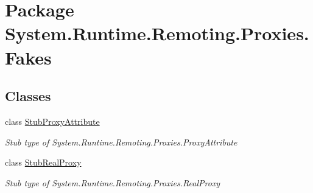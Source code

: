 \hypertarget{namespace_system_1_1_runtime_1_1_remoting_1_1_proxies_1_1_fakes}{\section{Package System.\-Runtime.\-Remoting.\-Proxies.\-Fakes}
\label{namespace_system_1_1_runtime_1_1_remoting_1_1_proxies_1_1_fakes}
}
\subsection*{Classes}
\begin{DoxyCompactItemize}
\item 
class \hyperlink{class_system_1_1_runtime_1_1_remoting_1_1_proxies_1_1_fakes_1_1_stub_proxy_attribute}{Stub\-Proxy\-Attribute}
\begin{DoxyCompactList}\small\item\em Stub type of System.\-Runtime.\-Remoting.\-Proxies.\-Proxy\-Attribute\end{DoxyCompactList}\item 
class \hyperlink{class_system_1_1_runtime_1_1_remoting_1_1_proxies_1_1_fakes_1_1_stub_real_proxy}{Stub\-Real\-Proxy}
\begin{DoxyCompactList}\small\item\em Stub type of System.\-Runtime.\-Remoting.\-Proxies.\-Real\-Proxy\end{DoxyCompactList}\end{DoxyCompactItemize}
